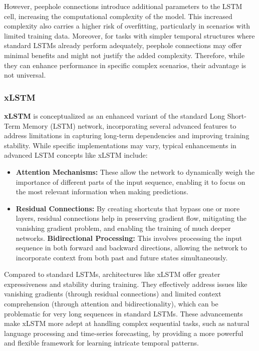 \documentclass[a4paper]{article}
\begin{document}
\begin{multicols}{2}
However, peephole connections introduce additional parameters to the LSTM cell, increasing the computational complexity of the model. This increased complexity also carries a higher risk of overfitting, particularly in scenarios with limited training data. Moreover, for tasks with simpler temporal structures where standard LSTMs already perform adequately, peephole connections may offer minimal benefits and might not justify the added complexity. Therefore, while they can enhance performance in specific complex scenarios, their advantage is not universal.

\subsubsection{xLSTM}
\textbf{xLSTM} is conceptualized as an enhanced variant of the standard Long Short-Term Memory (LSTM) network, incorporating several advanced features to address limitations in capturing long-term dependencies and improving training stability. While specific implementations may vary, typical enhancements in advanced LSTM concepts like xLSTM include:
\begin{itemize}
    \item \textbf{Attention Mechanisms:} These allow the network to dynamically weigh the importance of different parts of the input sequence, enabling it to focus on the most relevant information when making predictions.
    \item \textbf{Residual Connections:} By creating shortcuts that bypass one or more layers, residual connections help in preserving gradient flow, mitigating the vanishing gradient problem, and enabling the training of much deeper networks.
    \textbf{Bidirectional Processing:} This involves processing the input sequence in both forward and backward directions, allowing the network to incorporate context from both past and future states simultaneously.
\end{itemize}
Compared to standard LSTMs, architectures like xLSTM offer greater expressiveness and stability during training. They effectively address issues like vanishing gradients (through residual connections) and limited context comprehension (through attention and bidirectionality), which can be problematic for very long sequences in standard LSTMs. These advancements make xLSTM more adept at handling complex sequential tasks, such as natural language processing and time-series forecasting, by providing a more powerful and flexible framework for learning intricate temporal patterns.


\end{multicols}
\end{document}
